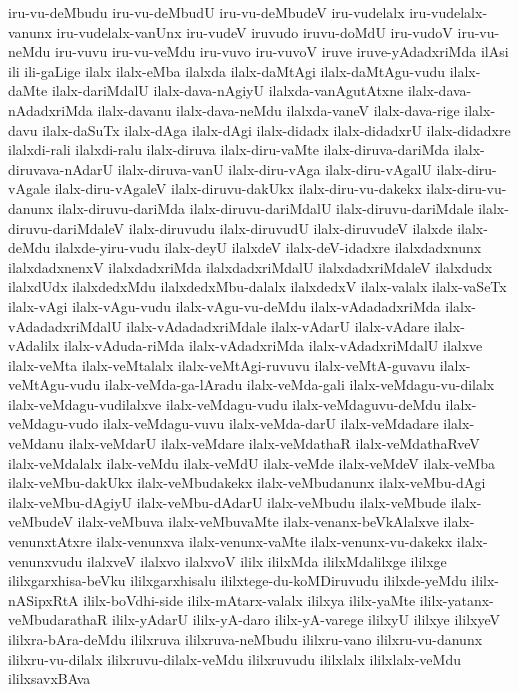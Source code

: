 {iru-vu-deMbudu
iru-vu-deMbudU
iru-vu-deMbudeV
iru-vudelalx
iru-vudelalx-vanunx
iru-vudelalx-vanUnx
iru-vudeV
iruvudo
iruvu-doMdU
iru-vudoV
iru-vu-neMdu
iru-vuvu
iru-vu-veMdu
iru-vuvo
iru-vuvoV
iruve
iruve-yAdadxriMda
ilAsi
ili
ili-gaLige
ilalx
ilalx-eMba
ilalxda
ilalx-daMtAgi
ilalx-daMtAgu-vudu
ilalx-daMte
ilalx-dariMdalU
ilalx-dava-nAgiyU
ilalxda-vanAgutAtxne
ilalx-dava-nAdadxriMda
ilalx-davanu
ilalx-dava-neMdu
ilalxda-vaneV
ilalx-dava-rige
ilalx-davu
ilalx-daSuTx
ilalx-dAga
ilalx-dAgi
ilalx-didadx
ilalx-didadxrU
ilalx-didadxre
ilalxdi-rali
ilalxdi-ralu
ilalx-diruva
ilalx-diru-vaMte
ilalx-diruva-dariMda
ilalx-diruvava-nAdarU
ilalx-diruva-vanU
ilalx-diru-vAga
ilalx-diru-vAgalU
ilalx-diru-vAgale
ilalx-diru-vAgaleV
ilalx-diruvu-dakUkx
ilalx-diru-vu-dakekx
ilalx-diru-vu-danunx
ilalx-diruvu-dariMda
ilalx-diruvu-dariMdalU
ilalx-diruvu-dariMdale
ilalx-diruvu-dariMdaleV
ilalx-diruvudu
ilalx-diruvudU
ilalx-diruvudeV
ilalxde
ilalx-deMdu
ilalxde-yiru-vudu
ilalx-deyU
ilalxdeV
ilalx-deV-idadxre
ilalxdadxnunx
ilalxdadxnenxV
ilalxdadxriMda
ilalxdadxriMdalU
ilalxdadxriMdaleV
ilalxdudx
ilalxdUdx
ilalxdedxMdu
ilalxdedxMbu-dalalx
ilalxdedxV
ilalx-valalx
ilalx-vaSeTx
ilalx-vAgi
ilalx-vAgu-vudu
ilalx-vAgu-vu-deMdu
ilalx-vAdadadxriMda
ilalx-vAdadadxriMdalU
ilalx-vAdadadxriMdale
ilalx-vAdarU
ilalx-vAdare
ilalx-vAdalilx
ilalx-vAduda-riMda
ilalx-vAdadxriMda
ilalx-vAdadxriMdalU
ilalxve
ilalx-veMta
ilalx-veMtalalx
ilalx-veMtAgi-ruvuvu
ilalx-veMtA-guvavu
ilalx-veMtAgu-vudu
ilalx-veMda-ga-lAradu
ilalx-veMda-gali
ilalx-veMdagu-vu-dilalx
ilalx-veMdagu-vudilalxve
ilalx-veMdagu-vudu
ilalx-veMdaguvu-deMdu
ilalx-veMdagu-vudo
ilalx-veMdagu-vuvu
ilalx-veMda-darU
ilalx-veMdadare
ilalx-veMdanu
ilalx-veMdarU
ilalx-veMdare
ilalx-veMdathaR
ilalx-veMdathaRveV
ilalx-veMdalalx
ilalx-veMdu
ilalx-veMdU
ilalx-veMde
ilalx-veMdeV
ilalx-veMba
ilalx-veMbu-dakUkx
ilalx-veMbudakekx
ilalx-veMbudanunx
ilalx-veMbu-dAgi
ilalx-veMbu-dAgiyU
ilalx-veMbu-dAdarU
ilalx-veMbudu
ilalx-veMbude
ilalx-veMbudeV
ilalx-veMbuva
ilalx-veMbuvaMte
ilalx-venanx-beVkAlalxve
ilalx-venunxtAtxre
ilalx-venunxva
ilalx-venunx-vaMte
ilalx-venunx-vu-dakekx
ilalx-venunxvudu
ilalxveV
ilalxvo
ilalxvoV
ililx
ililxMda
ililxMdalilxge
ililxge
ililxgarxhisa-beVku
ililxgarxhisalu
ililxtege-du-koMDiruvudu
ililxde-yeMdu
ililx-nASipxRtA
ililx-boVdhi-side
ililx-mAtarx-valalx
ililxya
ililx-yaMte
ililx-yatanx-veMbudarathaR
ililx-yAdarU
ililx-yA-daro
ililx-yA-varege
ililxyU
ililxye
ililxyeV
ililxra-bAra-deMdu
ililxruva
ililxruva-neMbudu
ililxru-vano
ililxru-vu-danunx
ililxru-vu-dilalx
ililxruvu-dilalx-veMdu
ililxruvudu
ililxlalx
ililxlalx-veMdu
ililxsavxBAva
}
